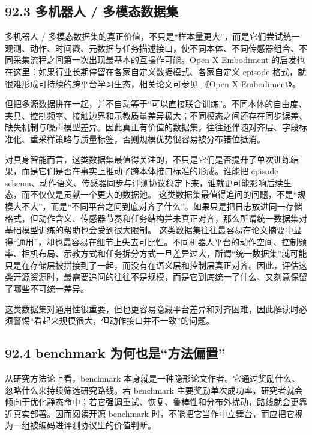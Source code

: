 \subsection*{92.3 多机器人 / 多模态数据集}


多机器人 / 多模态数据集的真正价值，不只是“样本量更大”，而是它们尝试统一观测、动作、时间戳、元数据与任务描述接口，使不同本体、不同传感器组合、不同采集流程之间第一次出现最基本的互操作可能。Open X-Embodiment 的启发也在这里：如果行业长期停留在各家自定义数据模式、各家自定义 episode 格式，就很难形成可持续的跨平台学习生态，相关论文可参见 \href{https://arxiv.org/abs/2310.08864}{《Open X-Embodiment》}。

但把多源数据拼在一起，并不自动等于“可以直接联合训练”。不同本体的自由度、夹具、控制频率、接触边界和示教质量差异极大；不同模态之间还存在同步误差、缺失机制与噪声模型差异。因此真正有价值的数据集，往往还伴随对齐层、字段标准化、重采样策略与质量标签，否则规模优势很容易被分布错位抵消。

对具身智能而言，这类数据集最值得关注的，不只是它们是否提升了单次训练结果，而是它们是否在事实上推动了跨本体接口标准的形成。谁能把 episode schema、动作语义、传感器同步与评测协议稳定下来，谁就更可能影响后续生态，而不仅仅是贡献一个更大的数据池。 这类数据集最值得追问的问题，不是“规模大不大”，而是“不同平台之间到底对齐了什么”。如果只是把日志放进同一存储格式，但动作含义、传感器节奏和任务结构并未真正对齐，那么所谓统一数据集对基础模型训练的帮助也会受到很大限制。 这类数据集往往最容易在论文摘要中显得“通用”，却也最容易在细节上失去可比性。不同机器人平台的动作空间、控制频率、相机布局、示教方式和任务拆分方式一旦差异过大，所谓“统一数据集”就可能只是在存储层被拼接到了一起，而没有在语义层和控制层真正对齐。因此，评估这类开源资源时，最需要追问的往往不是规模，而是它到底统一了什么、又刻意保留了哪些不可统一差异。

这类数据集对通用性很重要，但也更容易隐藏平台差异和对齐困难，因此解读时必须警惕“看起来规模很大，但动作接口并不一致”的问题。

\subsection*{92.4 benchmark 为何也是“方法偏置”}


从研究方法论上看，benchmark 本身就是一种隐形论文作者。它通过奖励什么、忽略什么来持续筛选研究路线。若 benchmark 主要奖励单次成功率，研究者就会倾向于优化静态命中；若它强调重试、恢复、鲁棒性和分布外扰动，路线就会更靠近真实部署。因而阅读开源 benchmark 时，不能把它当作中立舞台，而应把它视为一组被编码进评测协议里的价值判断。


